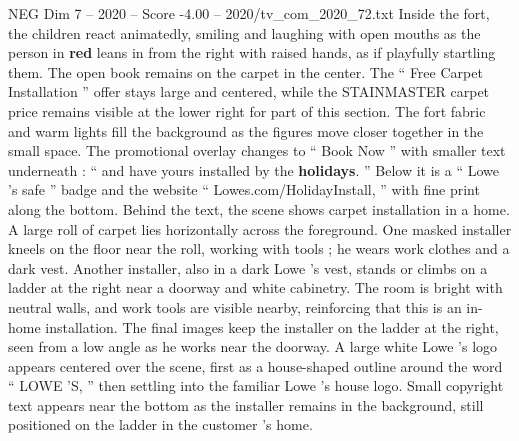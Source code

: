 \begin{textsample}{NEG Dim 7 – 2020 – Score -4.00 – 2020/tv\_com\_2020\_72.txt}
Inside the fort, the children react animatedly, smiling and laughing with open mouths as the person in \textbf{red} leans in from the right with raised hands, as if playfully startling them.
The open book remains on the carpet in the center.
The “ Free Carpet Installation ” offer stays large and centered, while the STAINMASTER carpet price remains visible at the lower right for part of this section.
The fort fabric and warm lights fill the background as the figures move closer together in the small space.
The promotional overlay changes to “ Book Now ” with smaller text underneath : “ and have yours installed by the \textbf{holidays}. ” Below it is a “ Lowe ’s safe ” badge and the website “ Lowes.com/HolidayInstall, ” with fine print along the bottom.
Behind the text, the scene shows carpet installation in a home.
A large roll of carpet lies horizontally across the foreground.
One masked installer kneels on the floor near the roll, working with tools ; he wears work clothes and a dark vest.
Another installer, also in a dark Lowe ’s vest, stands or climbs on a ladder at the right near a doorway and white cabinetry.
The room is bright with neutral walls, and work tools are visible nearby, reinforcing that this is an in-home installation.
The final images keep the installer on the ladder at the right, seen from a low angle as he works near the doorway.
A large white Lowe ’s logo appears centered over the scene, first as a house-shaped outline around the word “ LOWE ’S, ” then settling into the familiar Lowe ’s house logo.
Small copyright text appears near the bottom as the installer remains in the background, still positioned on the ladder in the customer ’s home.

\end{textsample}
